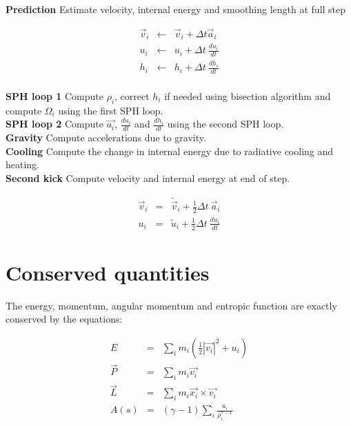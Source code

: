 \documentclass[a4paper,10pt]{article}
\begin{document}
\textbf{Prediction} Estimate velocity, internal energy and smoothing length at full step

\begin{eqnarray*}
\vec{v}_i &\leftarrow& \vec{v}_i + \Delta t \vec{a}_i \\
u_i &\leftarrow& u_i + \Delta t ~\frac{du_i}{dt} \\
h_i &\leftarrow& h_i + \Delta t ~\frac{dh_i}{dt} \\
\end{eqnarray*}

\textbf{SPH loop 1} Compute $\rho_i$, correct $h_i$ if needed using bisection algorithm and compute $\Omega_i$ using the
first SPH loop. \\

\textbf{SPH loop 2} Compute $\vec{a_i}$, $\frac{du_i}{dt}$ and $\frac{dh_i}{dt}$ using the second SPH loop. \\

\textbf{Gravity} Compute accelerations due to gravity. \\

\textbf{Cooling} Compute the change in internal energy due to radiative cooling and heating. \\

\textbf{Second kick} Compute velocity and internal energy at end of step. 

\begin{eqnarray*}
 \vec{v}_i &=& \tilde{\vec{v}}_i + \textstyle\frac{1}{2}\Delta t ~\vec{a}_i \\
 u_i &=& \tilde{u}_i + \textstyle\frac{1}{2}\Delta t ~\frac{du_i}{dt}
\end{eqnarray*}




\section{Conserved quantities}

The energy, momentum, angular momentum and entropic function are exactly conserved by the equations:

\begin{eqnarray}
E &=&\sum_i m_i\left(\frac{1}{2}|\vec{v_i}|^2+u_i\right)\\
\vec{P} &=&\sum_i m_i \vec{v_i}\\
\vec{L} &=& \sum_i m_i \vec{x_i} \times \vec{v_i}\\ 
A(s) &=& \left(\gamma -1 \right)\sum_i \frac{u_i}{\rho_i^{\gamma - 1}}
\end{eqnarray}
\end{document}
